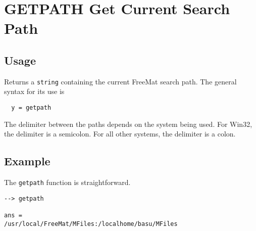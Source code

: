 \section{GETPATH Get Current Search Path}

\subsection{Usage}

Returns a \verb|string| containing the current FreeMat search path.  The general syntax for
its use is
\begin{verbatim}
  y = getpath
\end{verbatim}
The delimiter between the paths depends on the system being used.  For Win32, the
delimiter is a semicolon.  For all other systems, the delimiter is a colon.

\subsection{Example}

The \verb|getpath| function is straightforward.
\begin{verbatim}
--> getpath

ans = 
/usr/local/FreeMat/MFiles:/localhome/basu/MFiles
\end{verbatim}
